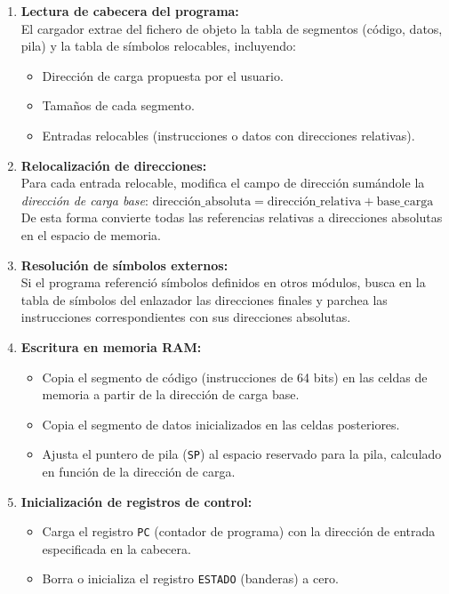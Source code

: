 \documentclass{article}
\begin{document}
\begin{enumerate}
\item \textbf{Lectura de cabecera del programa:}\\
El cargador extrae del fichero de objeto la tabla de segmentos (código, datos, pila) y la tabla de símbolos relocables, incluyendo:
\begin{itemize}
\item Dirección de carga propuesta por el usuario.
\item Tamaños de cada segmento.
\item Entradas relocables (instrucciones o datos con direcciones relativas).
\end{itemize}

\item \textbf{Relocalización de direcciones:}\\
Para cada entrada relocable, modifica el campo de dirección sumándole la \emph{dirección de carga base}:
$       \text{dirección\_absoluta} = \text{dirección\_relativa} + \text{base\_carga}
    $
De esta forma convierte todas las referencias relativas a direcciones absolutas en el espacio de memoria.

\item \textbf{Resolución de símbolos externos:}\\
Si el programa referenció símbolos definidos en otros módulos, busca en la tabla de símbolos del enlazador las direcciones finales y parchea las instrucciones correspondientes con sus direcciones absolutas.

\item \textbf{Escritura en memoria RAM:}\\
\begin{itemize}
\item Copia el segmento de código (instrucciones de 64 bits) en las celdas de memoria a partir de la dirección de carga base.
\item Copia el segmento de datos inicializados en las celdas posteriores.
\item Ajusta el puntero de pila (\texttt{SP}) al espacio reservado para la pila, calculado en función de la dirección de carga.
\end{itemize}

\item \textbf{Inicialización de registros de control:}\\
\begin{itemize}
\item Carga el registro \texttt{PC} (contador de programa) con la dirección de entrada especificada en la cabecera.
\item Borra o inicializa el registro \texttt{ESTADO} (banderas) a cero.
\end{itemize}


\end{enumerate}
\end{document}
